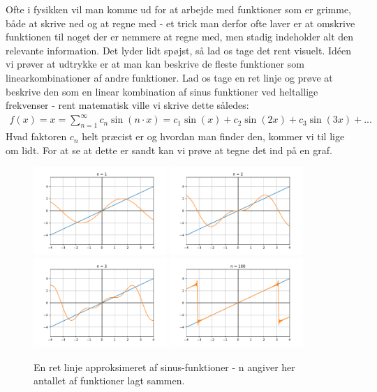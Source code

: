 \documentclass[crop=false, class=memoir]{standalone}
\begin{document}
Ofte i fysikken vil man komme ud for at arbejde med funktioner som er grimme, både at skrive ned og at regne med - et trick man derfor ofte laver er at omskrive funktionen til noget der er nemmere at regne med, men stadig indeholder alt den relevante information. Det lyder lidt spøjst, så lad os tage det rent visuelt. Idéen vi prøver at udtrykke er at man kan beskrive de fleste funktioner som linearkombinationer af andre funktioner. Lad os tage en ret linje og prøve at beskrive den som en linear kombination af sinus funktioner ved heltallige frekvenser - rent matematisk ville vi skrive dette således:
\begin{align}
    f(x) = x = \sum_{n = 1}^{\infty} c_n \sin(n\cdot x) = c_1 \sin(x) + c_2 \sin(2x) + c_3 \sin(3x) + ...
    \label{matf:eq:sinlin}
\end{align}
Hvad faktoren $c_n$ helt præcist er og hvordan man finder den, kommer vi til lige om lidt. For at se at dette er sandt kan vi prøve at tegne det ind på en graf.
\begin{figure}[H]
	\centering
	\includegraphics[width=0.45\textwidth]{Fysisk_Matematik/fig/1sin.pdf}
	\includegraphics[width=0.45\textwidth]{Fysisk_Matematik/fig/2sin.pdf}
	\includegraphics[width=0.45\textwidth]{Fysisk_Matematik/fig/3sin.pdf}
	\includegraphics[width=0.45\textwidth]{Fysisk_Matematik/fig/100sin.pdf}
	\caption{En ret linje approksimeret af sinus-funktioner - n angiver her antallet af funktioner lagt sammen.}
	\label{matf:fig:sinapproks}
\end{figure}
\end{document}
